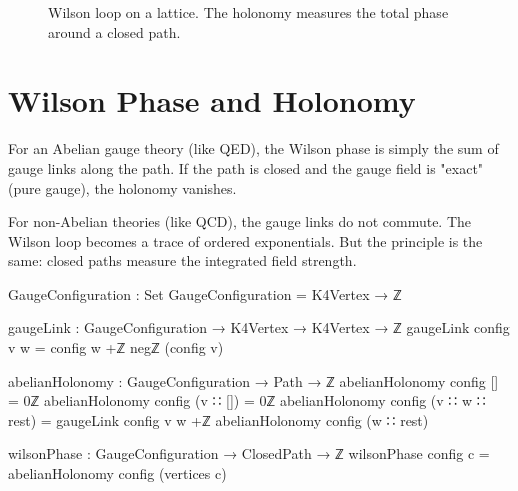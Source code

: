 \documentclass[11pt,a4paper]{book}
\def\text#1{#1}%
\begin{document}
\begin{figure}[h]
\centering
{}
\caption{Wilson loop on a lattice. The holonomy measures the total phase around a closed path.}
\label{fig:wilson-loop}
\end{figure}

\section{Wilson Phase and Holonomy}

For an Abelian gauge theory (like QED), the Wilson phase is simply the sum of gauge links along the path.
If the path is closed and the gauge field is "exact" (pure gauge), the holonomy vanishes.

For non-Abelian theories (like QCD), the gauge links do not commute. The Wilson loop becomes a trace of ordered exponentials. But the principle is the same: closed paths measure the integrated field strength.

\begin{code}
GaugeConfiguration : Set
GaugeConfiguration = K4Vertex → ℤ

gaugeLink : GaugeConfiguration → K4Vertex → K4Vertex → ℤ
gaugeLink config v w = config w +ℤ negℤ (config v)

abelianHolonomy : GaugeConfiguration → Path → ℤ
abelianHolonomy config [] = 0ℤ
abelianHolonomy config (v ∷ []) = 0ℤ
abelianHolonomy config (v ∷ w ∷ rest) = 
  gaugeLink config v w +ℤ abelianHolonomy config (w ∷ rest)

wilsonPhase : GaugeConfiguration → ClosedPath → ℤ
wilsonPhase config c = abelianHolonomy config (vertices c)
\end{code}
\end{document}
